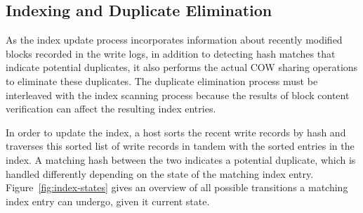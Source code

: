 \subsection{Indexing and Duplicate Elimination}

As the index update process incorporates information about recently
modified blocks recorded in the write logs, in addition to detecting
hash matches that indicate potential duplicates, it also performs
the actual COW sharing operations to eliminate these duplicates.  The
duplicate elimination process must be interleaved with the index
scanning process because the results of block content verification can
affect the resulting index entries.

In order to update the index, a host sorts the recent write
records by hash and traverses this sorted list of write records in
tandem with the sorted entries in the index.  A matching hash between
the two indicates a potential duplicate, which is handled differently
depending on the state of the matching index entry.
Figure~\ref{fig:index-states} gives an overview of all possible
transitions a matching index entry can undergo, given it current
state.

\captionsetup[subfloat]{subrefformat=parens}

